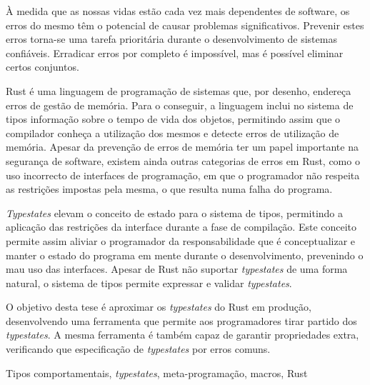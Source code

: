 
À medida que as nossas vidas estão cada vez mais dependentes de software,
os erros do mesmo têm o potencial de causar problemas significativos.
Prevenir estes erros torna-se uma tarefa prioritária durante o desenvolvimento de sistemas confiáveis.
Erradicar erros por completo é impossível, mas é possível eliminar certos conjuntos.

Rust é uma linguagem de programação de sistemas que, por desenho, endereça erros de gestão de memória.
Para o conseguir, a linguagem inclui no sistema de tipos informação sobre o tempo de vida dos objetos,
permitindo assim que o compilador conheça a utilização dos mesmos e detecte erros de utilização de memória.
Apesar da prevenção de erros de memória ter um papel importante na segurança de software,
existem ainda outras categorias de erros em Rust,
como o uso incorrecto de interfaces de programação, em que o programador não respeita as restrições impostas pela mesma, o que resulta numa falha do programa.

\emph{Typestates} elevam o conceito de estado para o sistema de tipos,
permitindo a aplicação das restrições da interface durante a fase de compilação.
Este conceito permite assim aliviar o programador da responsabilidade que é conceptualizar e manter o estado do programa em mente durante o desenvolvimento, prevenindo o mau uso das interfaces.
Apesar de Rust não suportar \emph{typestates} de uma forma natural,
o sistema de tipos permite expressar e validar \emph{typestates}.

O objetivo desta tese é aproximar os \emph{typestates} do Rust em produção,
desenvolvendo uma ferramenta que permite aos programadores tirar partido dos \emph{typestates}.
A mesma ferramenta é também capaz de garantir propriedades extra,
verificando que especificação de \emph{typestates} por erros comuns.

\begin{keywords}
Tipos comportamentais, \emph{typestates}, meta-programação, macros, Rust
\end{keywords}
